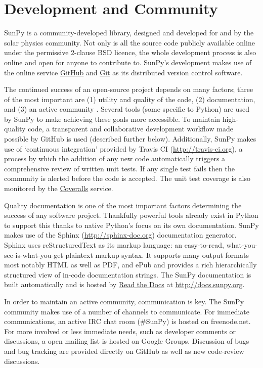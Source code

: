 \section{Development and Community}\label{sec:dev}
SunPy is a community-developed library, designed and developed for and by 
the solar physics community. Not only is all the source code publicly available 
online under the permissive 2-clause BSD licence, the whole 
development process is also online and open for anyone to contribute to.
SunPy's development makes use of the online service 
\href{http://github.com}{GitHub} and \href{http://git-scm.com/}{Git}
as its distributed version control software. 

The continued success of an open-source project depends on many factors;
three of the most important are (1) utility and quality of the code, (2) documentation, and (3) an
active community \citep{bangerth2013}. Several tools (some specific to Python) are used by
SunPy to make achieving these goals more accessible. To maintain high-quality code, a 
transparent and collaborative development workflow made possible by GitHub is used (described
further below).
Additionally, SunPy makes use of `continuous integration' provided by
Travis CI (\url{http://travis-ci.org}), a process by which the addition of any new code 
automatically triggers a comprehensive review of written unit tests. If any single test
fails then the community is alerted before the code is accepted. The unit test coverage is
also monitored by the \href{http://coveralls.io}{Coveralls} service.

Quality documentation is
one of the most important factors determining the success of any software project. 
Thankfully powerful tools already exist in Python to support this thanks to native
Python's focus on its own documentation. SunPy makes use of the Sphinx (\url{http://sphinx-doc.org})
documentation generator. Sphinx uses reStructuredText as its markup language: 
an easy-to-read, what-you-see-is-what-you-get plaintext markup syntax. It supports
many output formats most notably HTML as well as PDF, and ePub and provides a rich
hierarchically structured view of in-code documentation strings. The SunPy documentation 
is built automatically and is hosted by \href{http://readthedocs.org}{Read the 
Docs} at \url{http://docs.sunpy.org}. 

In order to maintain an active community, communication is key.  The SunPy community makes
use of a number of channels to communicate. For immediate communications, an active IRC chat
room (\#SunPy) is hosted on freenode.net. For more involved or less immediate needs, such as
developer comments or discussions, a open mailing list is hosted on Google Groups. 
Discussion of bugs and bug tracking are provided directly on GitHub as well as new
code-review discussions.

